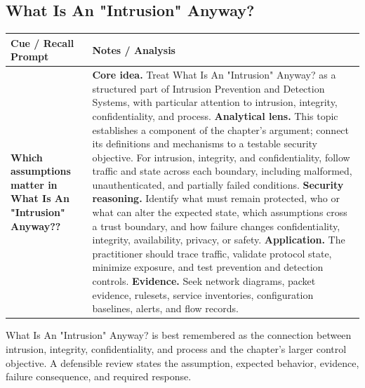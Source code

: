\documentclass[11pt]{article}
\newcommand{\CornellHeader}{%
\rowcolor{Navy}\color{white}\bfseries Cue / Recall Prompt & \color{white}\bfseries Notes / Analysis\\\hline}
\newcommand{\CornellRow}[2]{%
\cellcolor{CueGray}\RaggedRight\textbf{#1} & \RaggedRight #2\\\hline}
\begin{document}
\subsection*{What Is An "Intrusion" Anyway?}
\begin{longtable}{>{\RaggedRight\arraybackslash}p{}|>{\RaggedRight\arraybackslash}p{}}
\CornellHeader
\CornellRow{Which assumptions matter in What Is An "Intrusion" Anyway??}{\textbf{Core idea.} Treat What Is An "Intrusion" Anyway? as a structured part of Intrusion Prevention and Detection Systems, with particular attention to intrusion, integrity, confidentiality, and process. \textbf{Analytical lens.} This topic establishes a component of the chapter's argument; connect its definitions and mechanisms to a testable security objective. For intrusion, integrity, and confidentiality, follow traffic and state across each boundary, including malformed, unauthenticated, and partially failed conditions. \textbf{Security reasoning.} Identify what must remain protected, who or what can alter the expected state, which assumptions cross a trust boundary, and how failure changes confidentiality, integrity, availability, privacy, or safety. \textbf{Application.} The practitioner should trace traffic, validate protocol state, minimize exposure, and test prevention and detection controls. \textbf{Evidence.} Seek network diagrams, packet evidence, rulesets, service inventories, configuration baselines, alerts, and flow records.}
\end{longtable}
\begin{topicsummary}
What Is An "Intrusion" Anyway? is best remembered as the connection between intrusion, integrity, confidentiality, and process and the chapter's larger control objective. A defensible review states the assumption, expected behavior, evidence, failure consequence, and required response.
\end{topicsummary}
\end{document}
